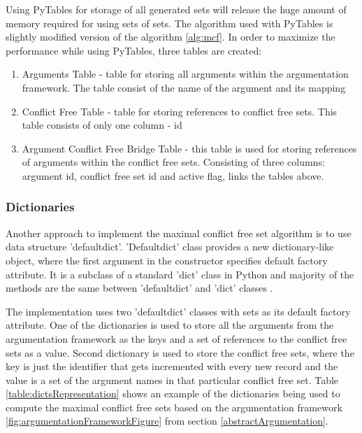 Using PyTables for storage of all generated sets will release the huge amount of memory required for using sets of sets. The algorithm used with PyTables is slightly modified version of the algorithm \ref{alg:mcf}. In order to maximize the performance while using PyTables, three tables are created:
\begin{enumerate}
	\item{Arguments Table - table for storing all arguments within the argumentation framework. The table consist of the name of the argument and its mapping}
	\item{Conflict Free Table - table for storing references to conflict free sets. This table consists of only one column - id}
	\item{Argument Conflict Free Bridge Table - this table is used for storing references of arguments within the conflict free sets. Consisting of three columns: argument id, conflict free set id and active flag, links the tables above.}
\end{enumerate}


\subsubsection{Dictionaries}\label{sec:dicts}
Another approach to implement the maximal conflict free set algorithm is to use data structure 'defaultdict'. 'Defaultdict' class provides a new dictionary-like object, where the first argument in the constructor specifies default factory attribute. It is a subclass of a standard 'dict' class in Python and majority of the methods are the same between 'defaultdict' and 'dict' classes \citep{defaultdict}.

The implementation uses two 'defaultdict' classes with sets as its default factory attribute. One of the dictionaries is used to store all the arguments from the argumentation framework as the keys and a set of references to the conflict free sets as a value. Second dictionary is used to store the conflict free sets, where the key is just the identifier that gets incremented with every new record and the value is a set of the argument names in that particular conflict free set. Table \ref{table:dictsRepresentation} shows an example of the dictionaries being used to compute the maximal conflict free sets based on the argumentation framework \ref{fig:argumentationFrameworkFigure} from section \ref{abstractArgumentation}.

